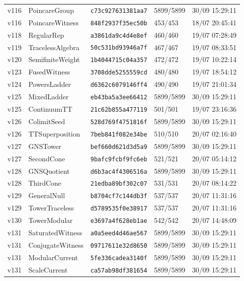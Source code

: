 \documentclass[11pt]{article}
\theoremstyle{definition}\newtheorem{deriv}{Derivação}
\begin{document}
{\begin{longtable}{@{}lllll@{}}
v116 & PoincareGroup & \texttt{c73c927631381aa7} & 5899/5899 & 30/09 15:29:11 \\
v116 & PoincareWitness & \texttt{848f2937f35ec50b} & 453/453 & 18/07 20:45:41 \\
v118 & RegularRep & \texttt{a3861da9c4d4e8ef} & 460/460 & 19/07 07:28:49 \\
v119 & TracelessAlgebra & \texttt{50c531bd93946a7f} & 467/467 & 19/07 08:33:51 \\
v120 & SemifiniteWeight & \texttt{1b4044715c04a357} & 472/472 & 19/07 10:22:14 \\
v123 & FusedWitness & \texttt{3708dde5255559cd} & 480/480 & 19/07 18:54:12 \\
v124 & PowersLadder & \texttt{d6362c6079146ff4} & 490/490 & 19/07 21:01:34 \\
v125 & MixedLadder & \texttt{eb43ba5a3ee66412} & 5899/5899 & 30/09 15:29:11 \\
v125 & ContinuumTT & \texttt{21c62b855a477119} & 501/501 & 19/07 23:16:36 \\
v126 & ColimitSeed & \texttt{528d769f4751816f} & 5899/5899 & 30/09 15:29:11 \\
v126 & TTSuperposition & \texttt{7beb841f082e34be} & 510/510 & 20/07 02:16:40 \\
v127 & GNSTower & \texttt{bef660d621d3d5a9} & 5899/5899 & 30/09 15:29:11 \\
v127 & SecondCone & \texttt{9bafc9fcbf9fc6eb} & 521/521 & 20/07 05:14:12 \\
v128 & GNSQuotient & \texttt{d6b3ac4f4306516a} & 5899/5899 & 30/09 15:29:11 \\
v128 & ThirdCone & \texttt{21edba89bf302c07} & 531/531 & 20/07 08:14:22 \\
v129 & GeneralNull & \texttt{b8704cf7c144db3f} & 537/537 & 20/07 11:31:16 \\
v129 & TowerTraceless & \texttt{d5789535f0e38917} & 537/537 & 20/07 11:31:16 \\
v130 & TowerModular & \texttt{e3697a4f628eb1ae} & 542/542 & 20/07 14:48:09 \\
v131 & SaturatedWitness & \texttt{a0a5eed4d46ae567} & 5899/5899 & 30/09 15:29:11 \\
v131 & ConjugateWitness & \texttt{09717611e32d8650} & 5899/5899 & 30/09 15:29:11 \\
v131 & ModularCurrent & \texttt{5fe336cadea3140f} & 5899/5899 & 30/09 15:29:11 \\
v131 & ScaleCurrent & \texttt{ca57ab98df381654} & 5899/5899 & 30/09 15:29:11 \\

\end{longtable}}
\end{document}
